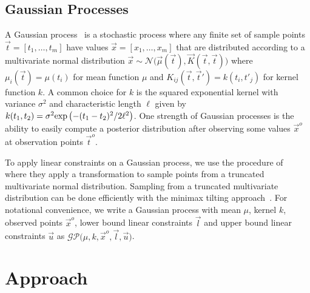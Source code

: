 \subsection{Gaussian Processes}
\label{subsec:gp2}

A Gaussian process~\cite{williams2006gaussian} is a stochastic process where any finite set of sample points $\vec{t} = \left[ t_1, \ldots, t_m \right]$ have values $\vec{x} = \left[ x_1, \ldots, x_m \right]$ that are distributed according to a multivariate normal distribution $
    \vec{x} \sim \mathcal{N}\big( \vec{\mu}(\vec{t}), \vec{K}(\vec{t}, \vec{t}) \big)$
where $\mu_i(\vec{t}) = \mu(t_i)$ for mean function $\mu$ and $K_{ij}(\vec{t}, \vec{t}') = k(t_i, t'_j)$ for kernel function $k$. A common choice for $k$ is the squared exponential kernel with variance $\sigma^2$ and characteristic length $\ell$ given by $
    k(t_1, t_2) = \sigma^2 {\rm exp}\left( - (t_1 - t_2)^2 / 2 \ell^2\right)$.
One strength of Gaussian processes is the ability to easily compute a posterior distribution after observing some values $\vec{x}^o$ at observation points $\vec{t}^o$.

To apply linear constraints on a Gaussian process, we use the procedure of \citeauthor{jidling2017linearly}~\cite{jidling2017linearly} where they apply a transformation to sample points from a truncated multivariate normal distribution. Sampling from a truncated multivariate distribution can be done efficiently with the minimax tilting approach~\cite{botev2017normal}. For notational convenience, we write a Gaussian process with mean $\mu$, kernel $k$, observed points $\vec{x}^o$, lower bound linear constraints $\vec{l}$ and upper bound linear constraints $\vec{u}$ as $
    \mathcal{GP}\big(\mu, k, \vec{x}^o, \vec{l}, \vec{u}\Big)$.





\section{Approach}

